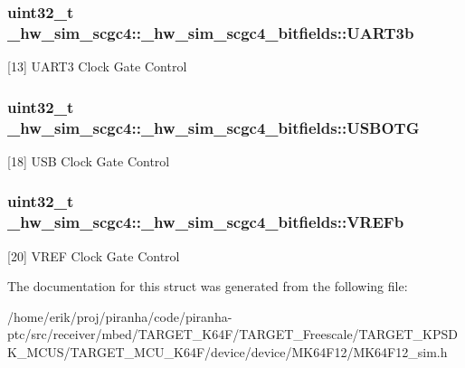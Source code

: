 \subsubsection[{\texorpdfstring{U\+A\+R\+T3b}{UART3b}}]{\setlength{\rightskip}{0pt plus 5cm}uint32\+\_\+t \+\_\+hw\+\_\+sim\+\_\+scgc4\+::\+\_\+hw\+\_\+sim\+\_\+scgc4\+\_\+bitfields\+::\+U\+A\+R\+T3b}\hypertarget{struct__hw__sim__scgc4_1_1__hw__sim__scgc4__bitfields_a5b6ccdcb37fe59cada74f8c8d3cc67fe}{}\label{struct__hw__sim__scgc4_1_1__hw__sim__scgc4__bitfields_a5b6ccdcb37fe59cada74f8c8d3cc67fe}
\mbox{[}13\mbox{]} U\+A\+R\+T3 Clock Gate Control 
\subsubsection[{\texorpdfstring{U\+S\+B\+O\+TG}{USBOTG}}]{\setlength{\rightskip}{0pt plus 5cm}uint32\+\_\+t \+\_\+hw\+\_\+sim\+\_\+scgc4\+::\+\_\+hw\+\_\+sim\+\_\+scgc4\+\_\+bitfields\+::\+U\+S\+B\+O\+TG}\hypertarget{struct__hw__sim__scgc4_1_1__hw__sim__scgc4__bitfields_aa4a40625f18eaf76d061fa1fe80b8b13}{}\label{struct__hw__sim__scgc4_1_1__hw__sim__scgc4__bitfields_aa4a40625f18eaf76d061fa1fe80b8b13}
\mbox{[}18\mbox{]} U\+SB Clock Gate Control 
\subsubsection[{\texorpdfstring{V\+R\+E\+Fb}{VREFb}}]{\setlength{\rightskip}{0pt plus 5cm}uint32\+\_\+t \+\_\+hw\+\_\+sim\+\_\+scgc4\+::\+\_\+hw\+\_\+sim\+\_\+scgc4\+\_\+bitfields\+::\+V\+R\+E\+Fb}\hypertarget{struct__hw__sim__scgc4_1_1__hw__sim__scgc4__bitfields_a81be937a4d9faf0af1f299eaf5d6f5c1}{}\label{struct__hw__sim__scgc4_1_1__hw__sim__scgc4__bitfields_a81be937a4d9faf0af1f299eaf5d6f5c1}
\mbox{[}20\mbox{]} V\+R\+EF Clock Gate Control 

The documentation for this struct was generated from the following file\+:\begin{DoxyCompactItemize}
\item 
/home/erik/proj/piranha/code/piranha-\/ptc/src/receiver/mbed/\+T\+A\+R\+G\+E\+T\+\_\+\+K64\+F/\+T\+A\+R\+G\+E\+T\+\_\+\+Freescale/\+T\+A\+R\+G\+E\+T\+\_\+\+K\+P\+S\+D\+K\+\_\+\+M\+C\+U\+S/\+T\+A\+R\+G\+E\+T\+\_\+\+M\+C\+U\+\_\+\+K64\+F/device/device/\+M\+K64\+F12/M\+K64\+F12\+\_\+sim.\+h\end{DoxyCompactItemize}
